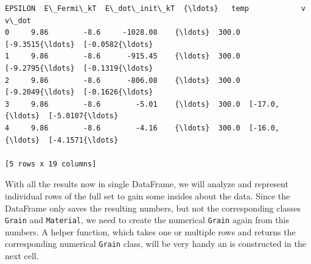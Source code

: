 \documentclass[11pt]{article}
\makeatletter
\newcommand{\boxspacing}{\kern\kvtcb@left@rule\kern\kvtcb@boxsep}
\newcommand{\prompt}[4]{
        \ttfamily\llap{{\color{#2}[#3]:\hspace{3pt}#4}}\vspace{-\baselineskip}
    }
\makeatother
\begin{document}
            \begin{tcolorbox}[breakable, size=fbox, boxrule=.5pt, pad at break*=1mm, opacityfill=0]
\prompt{Out}{outcolor}{66}{\boxspacing}
\begin{Verbatim}[commandchars=\\\{\}]
   EPSILON  E\_Fermi\_kT  E\_dot\_init\_kT  {\ldots}   temp            v        v\_dot
0     9.86        -8.6     -1028.08    {\ldots}  300.0  [-9.3515{\ldots}  [-0.0582{\ldots}
1     9.86        -8.6      -915.45    {\ldots}  300.0  [-9.2795{\ldots}  [-0.1319{\ldots}
2     9.86        -8.6      -806.08    {\ldots}  300.0  [-9.2049{\ldots}  [-0.1626{\ldots}
3     9.86        -8.6        -5.01    {\ldots}  300.0  [-17.0, {\ldots}  [-5.0107{\ldots}
4     9.86        -8.6        -4.16    {\ldots}  300.0  [-16.0, {\ldots}  [-4.1571{\ldots}

[5 rows x 19 columns]
\end{Verbatim}
\end{tcolorbox}
        
    With all the results now in single DataFrame, we will analyze and
represent individual rows of the full set to gain some insides about the
data. Since the DataFrame only saves the resulting numbers, but not the
corresponding classes \texttt{Grain} and \texttt{Material}, we need to
create the numerical \texttt{Grain} again from this numbers. A helper
function, which takes one or multiple rows and returns the corresponding
numerical \texttt{Grain} class, will be very handy an is constructed in
the next cell.
\end{document}
